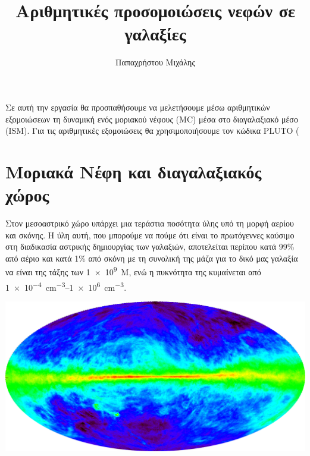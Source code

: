\documentclass[article,a4paper,11.2pt]{memoir}
\title{Αριθμητικές προσομοιώσεις νεφών σε γαλαξίες}
\author{Παπαχρήστου Μιχάλης}
\numberwithin{equation}{subsection}
\begin{document}
	

	
	\maketitle
	Σε αυτή την εργασία θα προσπαθήσουμε να μελετήσουμε μέσω αριθμητικών εξομοιώσεων τη δυναμική ενός μοριακού νέφους (MC) μέσα στο διαγαλαξιακό μέσο (ISM). Για τις αριθμητικές εξομοιώσεις θα χρησιμοποιήσουμε τον κώδικα PLUTO (%


\section{Μοριακά Νέφη και διαγαλαξιακός χώρος}
Στον μεσοαστρικό χώρο υπάρχει μια τεράστια ποσότητα ύλης υπό τη μορφή αερίου και σκόνης. Η ύλη αυτή, που μπορούμε να πούμε ότι είναι το πρωτόγεννες καύσιμο στη διαδικασία αστρικής δημιουργίας των γαλαξιών, αποτελείται περίπου κατά 99\% από αέριο και κατά 1\% από σκόνη με τη συνολική της μάζα για το δικό μας γαλαξία να είναι της τάξης των \SI{1e9}{ M_{\odot}}, ενώ η πυκνότητα της κυμαίνεται από \SIrange{1e-4}{1e6}{cm^{-3}}.

\begin{marginfigure}
	\label{fig:21}
	\centering
	\includegraphics[width=1\linewidth]{Images/21.png}
	\caption{Εκπομπή του  στα 21.1 cm (Kalberla et al., 2005)%
		H εκπομπή της γραμμής $21.1 \, cm$ στα ραδιοκύματα που οφείλεται στη μετάπτωση αντιστροφής του spin του πρωτονίου και του ηλεκτρονίου στη βασική κατάσταση του ατόμου του Υδρογόνου. Η ενεργειακή διαφορά των καταστάσεων είναι 
		$h \nu=\SI{6e-6}{eV}$, η οποία αντιστοιχεί σε μήκος κύματος \SI{21}{cm}.}
\end{marginfigure}
\end{document}
